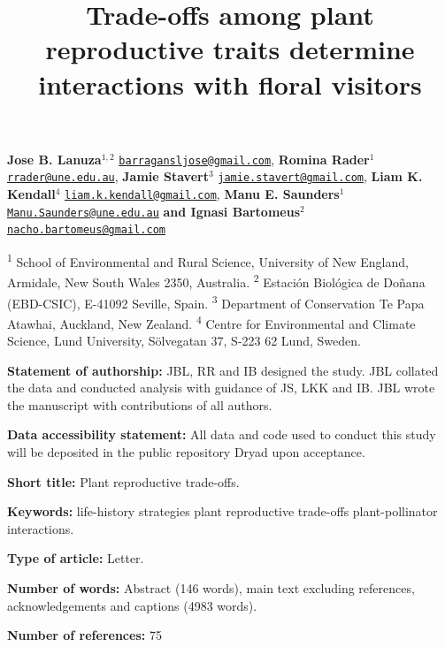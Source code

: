 \documentclass[
  12pt,
  a4paper,
]{article}
\title{\singlespacing \vspace{-1.6cm} \LARGE Trade-offs among plant reproductive traits determine interactions with floral visitors}
\author{}
\date{\vspace{-2.5em}}
\begin{document}
\maketitle

\vspace{-1.4cm}

\singlespacing

\textbf{Jose B. Lanuza$^{1,2}$} \href{mailto:barragansljose@gmail.com}{\nolinkurl{barragansljose@gmail.com}}, \textbf{Romina Rader$^{1}$} \href{mailto:rrader@une.edu.au}{\nolinkurl{rrader@une.edu.au}}, \textbf{Jamie Stavert$^{3}$} \href{mailto:jamie.stavert@gmail.com}{\nolinkurl{jamie.stavert@gmail.com}}, \textbf{Liam K. Kendall$^{4}$} \href{mailto:liam.k.kendall@gmail.com}{\nolinkurl{liam.k.kendall@gmail.com}}, \textbf{Manu E. Saunders$^{1}$} \href{mailto:Manu.Saunders@une.edu.au}{\nolinkurl{Manu.Saunders@une.edu.au}} \textbf{and Ignasi Bartomeus$^{2}$} \href{mailto:nacho.bartomeus@gmail.com}{\nolinkurl{nacho.bartomeus@gmail.com}}

\small

\textsuperscript{1} School of Environmental and Rural Science, University of New England, Armidale, New South Wales 2350, Australia. \textsuperscript{2} Estación Biológica de Doñana (EBD-CSIC), E-41092 Seville, Spain. \textsuperscript{3} Department of Conservation \textbar{} Te Papa Atawhai, Auckland, New Zealand. \textsuperscript{4} Centre for Environmental and Climate Science, Lund University, Sölvegatan 37, S-223 62 Lund, Sweden.

\doublespacing
\normalsize

\textbf{Statement of authorship:} JBL, RR and IB designed the study. JBL collated the data and conducted analysis with guidance of JS, LKK and IB. JBL wrote the manuscript with contributions of all authors.

\textbf{Data accessibility statement:} All data and code used to conduct this study will be deposited in the public repository Dryad upon acceptance.

\textbf{Short title:} Plant reproductive trade-offs.

\textbf{Keywords:} life-history strategies \textbar{} plant reproductive trade-offs \textbar{} plant-pollinator interactions.

\textbf{Type of article:} Letter.

\textbf{Number of words:} Abstract (146 words), main text excluding references, acknowledgements and captions (4983 words).

\textbf{Number of references:} 75
\end{document}

